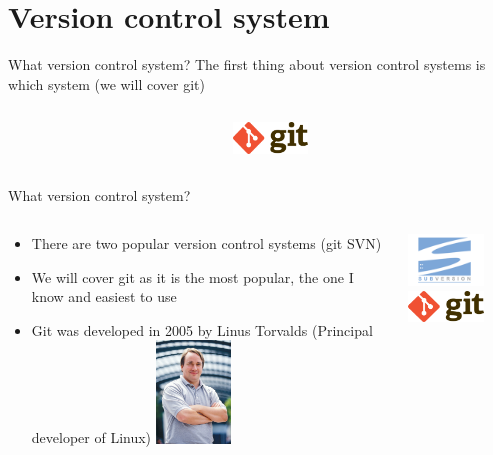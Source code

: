 \documentclass[10pt]{beamer}
\begin{document}
\section{Version control system}



\begin{frame}[fragile]{What version control system?}
The first thing about version control systems is which system (we will cover git) \\
\begin{columns}[T]
\begin{column}{.8\textwidth}
\end{column}
\begin{column}{.2\textwidth}
\includegraphics[width=2cm]{Figs/Git-logo}
\end{column}
\end{columns}
\end{frame}


\begin{frame}[fragile]{What version control system?}
\begin{columns}[T]
\begin{column}{.8\textwidth}
\begin{itemize}
\item There are two popular version control systems (git SVN)
\item We will cover git as it is the most popular, the one I know and easiest to use
\item Git was developed in 2005 by Linus Torvalds (Principal developer of Linux)
\includegraphics[width=2cm]{Figs/Linus_Torvalds}
\end{itemize}
\end{column}
\begin{column}{.2\textwidth}
\includegraphics[width=2cm]{Figs/SVN} \newline \newline
\includegraphics[width=2cm]{Figs/Git-logo}
\end{column}
\end{columns}
\end{frame}
\end{document}
